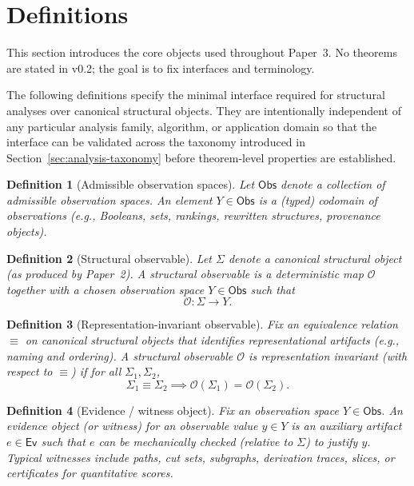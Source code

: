 \documentclass[11pt]{article}
\newtheorem{definition}{Definition}
\begin{document}
\section{Definitions}
\label{sec:definitions}
This section introduces the core objects used throughout Paper~3. No theorems are stated in v0.2; the goal is to fix interfaces and terminology.

The following definitions specify the minimal interface required for structural analyses over canonical structural objects. They are intentionally independent of any particular analysis family, algorithm, or application domain so that the interface can be validated across the taxonomy introduced in Section~\ref{sec:analysis-taxonomy} before theorem-level properties are established.

\begin{definition}[Admissible observation spaces]
\label{def:observation-spaces}
Let $\mathsf{Obs}$ denote a collection of \emph{admissible observation spaces}. An element $Y\in\mathsf{Obs}$ is a (typed) codomain of observations (e.g., Booleans, sets, rankings, rewritten structures, provenance objects).
\end{definition}

\begin{definition}[Structural observable]
\label{def:structural-observable}
Let $\Sigma$ denote a canonical structural object (as produced by Paper~2). A \emph{structural observable} is a deterministic map $\mathcal O$ together with a chosen observation space $Y\in\mathsf{Obs}$ such that
\[
\mathcal O: \Sigma \to Y.
\]
\end{definition}

\begin{definition}[Representation-invariant observable]
\label{def:representation-invariant-observable}
Fix an equivalence relation $\equiv$ on canonical structural objects that identifies representational artifacts (e.g., naming and ordering). A structural observable $\mathcal O$ is \emph{representation invariant} (with respect to $\equiv$) if for all $\Sigma_1,\Sigma_2$,
\[
\Sigma_1 \equiv \Sigma_2 \implies \mathcal O(\Sigma_1)=\mathcal O(\Sigma_2).
\]
\end{definition}

\begin{definition}[Evidence / witness object]
\label{def:witness-object}
Fix an observation space $Y\in\mathsf{Obs}$. An \emph{evidence object} (or \emph{witness}) for an observable value $y\in Y$ is an auxiliary artifact $e\in\mathsf{Ev}$ such that $e$ can be mechanically checked (relative to $\Sigma$) to justify $y$.
Typical witnesses include paths, cut sets, subgraphs, derivation traces, slices, or certificates for quantitative scores.
\end{definition}
\end{document}
